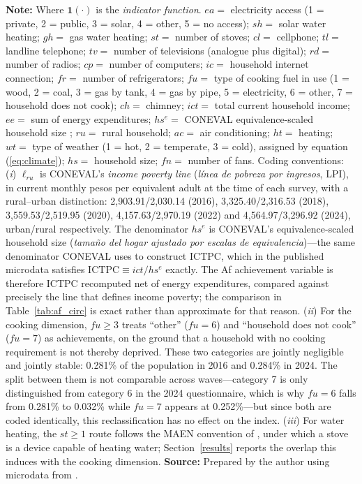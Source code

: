 \documentclass[11pt, a4paper]{article}
\begin{document}
{\begin{table}[ht]
\begin{justify}
\textbf{\textbf{Note:}} Where $\mathbf{1}(\cdot)$ is the \textit{indicator function}. $ea =$ electricity access (1 = private, 2 = public, 3 = solar, 4 = other, 5 = no access); $sh =$ solar water heating; $gh =$ gas water heating; $st =$ number of stoves; $cl =$ cellphone; $tl =$ landline telephone; $tv =$ number of televisions (analogue plus digital); $rd =$ number of radios; $cp =$ number of computers; $ic =$ household internet connection; $fr =$ number of refrigerators; $fu =$ type of cooking fuel in use (1 = wood, 2 = coal, 3 = gas by tank, 4 = gas by pipe, 5 = electricity, 6 = other, 7 = household does not cook); $ch =$ chimney; $ict =$ total current household income; $ee =$ sum of energy expenditures; $hs^e =$ CONEVAL equivalence-scaled household size \parencite{coneval2019}; $ru =$ rural household; $ac =$ air conditioning; $ht =$ heating; $wt =$ type of weather (1 = hot, 2 = temperate, 3 = cold), assigned by equation (\ref{eq:climate}); $hs =$ household size; $fn =$ number of fans. Coding conventions: (\textit{i}) $\ell_{ru}$ is CONEVAL's \textit{income poverty line} (\textit{línea de pobreza por ingresos}, LPI), in current monthly pesos per equivalent adult at the time of each survey, with a rural--urban distinction: 2{,}903.91/2{,}030.14 (2016), 3{,}325.40/2{,}316.53 (2018), 3{,}559.53/2{,}519.95 (2020), 4{,}157.63/2{,}970.19 (2022) and 4{,}564.97/3{,}296.92 (2024), urban/rural respectively. The denominator $hs^e$ is CONEVAL's equivalence-scaled household size (\textit{tamaño del hogar ajustado por escalas de equivalencia})---the same denominator CONEVAL uses to construct ICTPC, which in the published microdata satisfies $\mathrm{ICTPC} \equiv ict/hs^e$ exactly. The Af achievement variable is therefore ICTPC recomputed net of energy expenditures, compared against precisely the line that defines income poverty; the comparison in Table~\ref{tab:af_circ} is exact rather than approximate for that reason. (\textit{ii}) For the cooking dimension, $fu \geq 3$ treats ``other'' ($fu=6$) and ``household does not cook'' ($fu=7$) as achievements, on the ground that a household with no cooking requirement is not thereby deprived. These two categories are jointly negligible and jointly stable: 0.281\% of the population in 2016 and 0.284\% in 2024. The split between them is not comparable across waves---category 7 is only distinguished from category 6 in the 2024 questionnaire, which is why $fu=6$ falls from 0.281\% to 0.032\% while $fu=7$ appears at 0.252\%---but since both are coded identically, this reclassification has no effect on the index. (\textit{iii}) For water heating, the $st\geq 1$ route follows the MAEN convention of \textcite{garciaochoa2016}, under which a stove is a device capable of heating water; Section~\ref{results} reports the overlap this induces with the cooking dimension. \textbf{\textbf{Source:}} Prepared by the author using microdata from \textcite{enigh2016, enigh2018, enigh2020, enigh2022, enigh2024}.
\end{justify}
\label{tab2}
\end{table}
}
\end{document}
